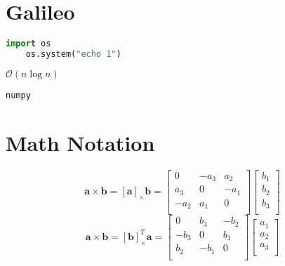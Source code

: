 \chapter{Galileo}
\label{sec:appendix_galileo}

\begin{lstlisting}[language=Python]
    import os
    os.system("echo 1")
\end{lstlisting}

$\mathcal{O}\left(n\log{n}\right)$

\verb+numpy+

\chapter{Math Notation}
\label{app:MathNotation}
\[
  \mathbf{a} \times  \mathbf{b}= \left[\mathbf{a}\right] _{\times} \mathbf{b}= \begin{bmatrix}
    0 & -a_3 & a_2 \\
    a_3 & 0 & -a_1 \\
    -a_2 & a_1     & 0     \\
  \end{bmatrix}
  \begin{bmatrix}
    b_1 \\
    b_2\\
    b_3\\
  \end{bmatrix}
\]
\[
  \mathbf{a} \times  \mathbf{b}= \left[\mathbf{b}\right]_{\times}^{T} \mathbf{a}= \begin{bmatrix}
    0 & b_3 & -b_2 \\
    -b_3 & 0 & b_1 \\
    b_2 & -b_1     & 0     \\
  \end{bmatrix}
  \begin{bmatrix}
    a_1 \\
    a_2\\
    a_3\\
  \end{bmatrix}
\]

